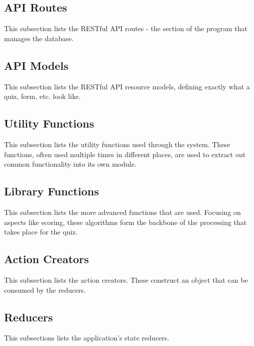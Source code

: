 \subsection{API Routes} %
\label{sub:api_routes}
This subsection lists the RESTful API routes - the section of the program that manages the database.


\subsection{API Models} %
\label{sub:api_models}
This subsection lists the RESTful API resource models, defining exactly what a quiz, form, etc. look like.


\subsection{Utility Functions} %
\label{sub:utility_functions}
This subsection lists the utility functions used through the system. These functions, often used multiple times in different places, are used to extract out common functionality into its own module.


\subsection{Library Functions} %
\label{sub:library_functions}
This subsection lists the more advanced functions that are used. Focusing on aspects like scoring, these algorithms form the backbone of the processing that takes place for the quiz.


\subsection{Action Creators} %
\label{sub:action_creators}
This subsection lists the action creators. These construct an object that can be consumed by the reducers.


\subsection{Reducers} %
\label{sub:reducers}
This subsections lists the application's state reducers.


